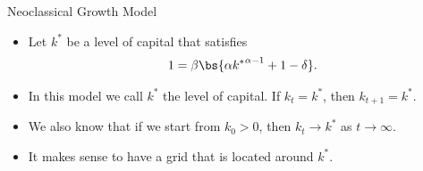 \documentclass[11pt,xcolor={dvipsnames},aspectratio=159,hyperref={pdftex,pdfpagemode=UseNone,hidelinks,pdfdisplaydoctitle=true},usepdftitle=false]{beamer}
\begin{document}
\begin{frame}{Neoclassical Growth Model}
    \begin{itemize}
       \item Let $k^*$ be a level of capital that satisfies \begin{align*}
        1 = \beta \bs{\alpha {k^*}^{\alpha-1} + 1-\delta}.
       \end{align*}
       \item In this model we call $k^*$ the  level of capital. If $k_t = k^*$, then $k_{t+1} = k^*$.
       \item We also know that if we start from $k_0>0$, then $k_t \to k^*$ as $t\to\infty$.
       \item It makes sense to have a grid that is located around $k^*$.   
\end{itemize}
\end{frame}
\end{document}
